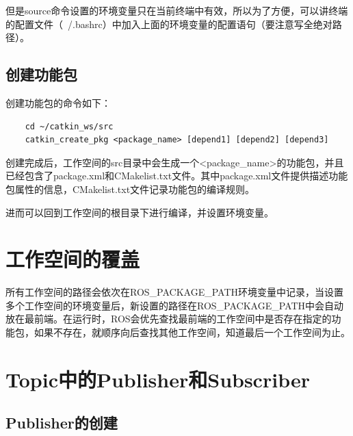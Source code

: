 \documentclass[9pt, oneside]{book}
\begin{document}
但是source命令设置的环境变量只在当前终端中有效，所以为了方便，可以讲终端的配置文件（~/.bashrc）中加入上面的环境变量的配置语句（要注意写全绝对路径）。

\subsection{创建功能包}

创建功能包的命令如下：

\begin{verbatim}
    cd ~/catkin_ws/src
    catkin_create_pkg <package_name> [depend1] [depend2] [depend3]
\end{verbatim}

创建完成后，工作空间的src目录中会生成一个<package\_name>的功能包，并且已经包含了package.xml和CMakelist.txt文件。其中package.xml文件提供描述功能包属性的信息，CMakelist.txt文件记录功能包的编译规则。

进而可以回到工作空间的根目录下进行编译，并设置环境变量。

\section{工作空间的覆盖}

所有工作空间的路径会依次在ROS\_PACKAGE\_PATH环境变量中记录，当设置多个工作空间的环境变量后，新设置的路径在ROS\_PACKAGE\_PATH中会自动放在最前端。在运行时，ROS会优先查找最前端的工作空间中是否存在指定的功能包，如果不存在，就顺序向后查找其他工作空间，知道最后一个工作空间为止。

\section{Topic中的Publisher和Subscriber}

\subsection{Publisher的创建}
\end{document}

